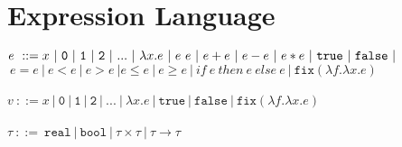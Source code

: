 \documentclass{westhesis}
\begin{document}
\section{Expression Language}
 $e \ ::= x  \ | \ \texttt{0} \ | \ \texttt{1} \ | \ \texttt{2} \ | \ ... \ | \ \lambda x.e \ | \ e \ e \ | \ e + e \ | \ e - e \ | \  e  *  e \ | \ \texttt{true} \ | 
 \ \texttt{false} \ | \\$
\-\hspace{.8cm}$\ e  =  e \ | \ e < e \ | \ e > e \ | e \leq e \ | \ e \geq e \ | \ if \ e \ then \ e \ else \ e \ | \ \texttt{fix} (\lambda f.\lambda x.e)$ \\ \\
 $v \ ::= x  \ | \ \texttt{0} \ | \ \texttt{1} \ | \ \texttt{2} \ | \ ... \ | \ \lambda x.e \ | \ \texttt{true} \ |  \ \texttt{false} \ 
 | \ \texttt{fix} (\lambda f.\lambda x.e)$ \\ \\
$\tau \ ::= \ \texttt{real} \ | \ \texttt{bool} \ | \ \tau \times \tau \ | \ \tau \rightarrow \tau$
\end{document}

